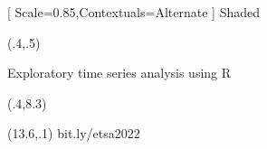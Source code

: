 \usepackage{bm,booktabs,tabularx,animate,fontawesome}

\graphicspath{{figs/}}
\def\full#1{\centerline{\texttt{[image: \#1]}}}

\usepackage{fontspec,sourcesanspro}
\setmonofont{Hack FC Ligatured-Regular}[
Scale=0.85,Contextuals=Alternate %
]
\fontsize{13}{15}\sf
{}
\ifcsname Shaded\endcsname
  \renewenvironment{Shaded}{\color{black}\fontsize{10}{10}\sf\begin{snugshade}\color{black}}{\end{snugshade}}
\fi


\def\E{\text{E}}
\def\V{\text{Var}}
\def\Var{\text{Var}}
\def\var{\text{Var}}
\def\max{\text{max}}

{
\begin{textblock}{5}(.4,.5)\fontsize{24}{24}\sf
  {\raggedright\color{Orange}\par Exploratory time series analysis using R}
\end{textblock}
\begin{textblock}{12.5}(.4,8.3)
  {\fontsize{13}{13}\sf\color{Orange}\insertauthor}
\end{textblock}
\begin{textblock}{7.5}(13.6,.1)
  {\fontsize{9}{9}\sf\color{Orange}bit.ly/etsa2022}
\end{textblock}
}
